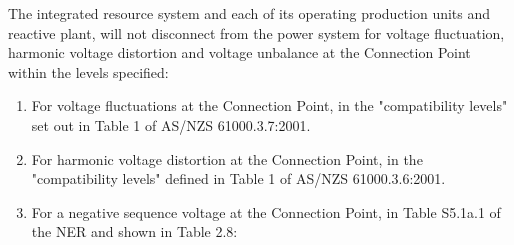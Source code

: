The integrated resource system and each of its operating production units and reactive plant, will not disconnect from the power system for voltage fluctuation, harmonic voltage distortion and voltage unbalance at the Connection Point within the levels specified:
\begin{enumerate}
	\item For voltage fluctuations at the Connection Point, in the "compatibility levels" set out in Table 1 of AS/NZS 61000.3.7:2001.
	\item For harmonic voltage distortion at the Connection Point, in the "compatibility levels" defined in Table 1 of AS/NZS 61000.3.6:2001.
	\item For a negative sequence voltage at the Connection Point, in Table S5.1a.1 of the NER and shown in Table 2.8:
\end{enumerate}

\begin{table}[H]
	\centering
	\caption*{Table 2.8: Negative Sequence Voltages}
\end{table}
